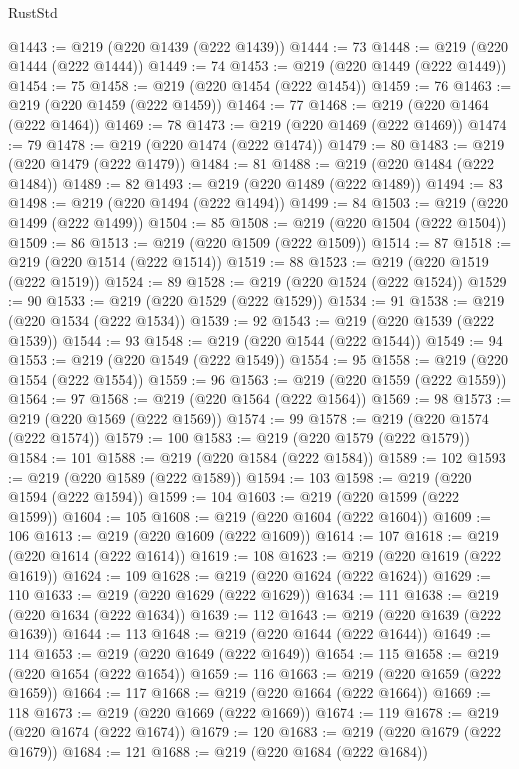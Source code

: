 \begin{lexlean}{RustStd}
\begin{coremodule}
@1443 := @219 (@220 @1439 (@222 @1439))
@1444 := 73
@1448 := @219 (@220 @1444 (@222 @1444))
@1449 := 74
@1453 := @219 (@220 @1449 (@222 @1449))
@1454 := 75
@1458 := @219 (@220 @1454 (@222 @1454))
@1459 := 76
@1463 := @219 (@220 @1459 (@222 @1459))
@1464 := 77
@1468 := @219 (@220 @1464 (@222 @1464))
@1469 := 78
@1473 := @219 (@220 @1469 (@222 @1469))
@1474 := 79
@1478 := @219 (@220 @1474 (@222 @1474))
@1479 := 80
@1483 := @219 (@220 @1479 (@222 @1479))
@1484 := 81
@1488 := @219 (@220 @1484 (@222 @1484))
@1489 := 82
@1493 := @219 (@220 @1489 (@222 @1489))
@1494 := 83
@1498 := @219 (@220 @1494 (@222 @1494))
@1499 := 84
@1503 := @219 (@220 @1499 (@222 @1499))
@1504 := 85
@1508 := @219 (@220 @1504 (@222 @1504))
@1509 := 86
@1513 := @219 (@220 @1509 (@222 @1509))
@1514 := 87
@1518 := @219 (@220 @1514 (@222 @1514))
@1519 := 88
@1523 := @219 (@220 @1519 (@222 @1519))
@1524 := 89
@1528 := @219 (@220 @1524 (@222 @1524))
@1529 := 90
@1533 := @219 (@220 @1529 (@222 @1529))
@1534 := 91
@1538 := @219 (@220 @1534 (@222 @1534))
@1539 := 92
@1543 := @219 (@220 @1539 (@222 @1539))
@1544 := 93
@1548 := @219 (@220 @1544 (@222 @1544))
@1549 := 94
@1553 := @219 (@220 @1549 (@222 @1549))
@1554 := 95
@1558 := @219 (@220 @1554 (@222 @1554))
@1559 := 96
@1563 := @219 (@220 @1559 (@222 @1559))
@1564 := 97
@1568 := @219 (@220 @1564 (@222 @1564))
@1569 := 98
@1573 := @219 (@220 @1569 (@222 @1569))
@1574 := 99
@1578 := @219 (@220 @1574 (@222 @1574))
@1579 := 100
@1583 := @219 (@220 @1579 (@222 @1579))
@1584 := 101
@1588 := @219 (@220 @1584 (@222 @1584))
@1589 := 102
@1593 := @219 (@220 @1589 (@222 @1589))
@1594 := 103
@1598 := @219 (@220 @1594 (@222 @1594))
@1599 := 104
@1603 := @219 (@220 @1599 (@222 @1599))
@1604 := 105
@1608 := @219 (@220 @1604 (@222 @1604))
@1609 := 106
@1613 := @219 (@220 @1609 (@222 @1609))
@1614 := 107
@1618 := @219 (@220 @1614 (@222 @1614))
@1619 := 108
@1623 := @219 (@220 @1619 (@222 @1619))
@1624 := 109
@1628 := @219 (@220 @1624 (@222 @1624))
@1629 := 110
@1633 := @219 (@220 @1629 (@222 @1629))
@1634 := 111
@1638 := @219 (@220 @1634 (@222 @1634))
@1639 := 112
@1643 := @219 (@220 @1639 (@222 @1639))
@1644 := 113
@1648 := @219 (@220 @1644 (@222 @1644))
@1649 := 114
@1653 := @219 (@220 @1649 (@222 @1649))
@1654 := 115
@1658 := @219 (@220 @1654 (@222 @1654))
@1659 := 116
@1663 := @219 (@220 @1659 (@222 @1659))
@1664 := 117
@1668 := @219 (@220 @1664 (@222 @1664))
@1669 := 118
@1673 := @219 (@220 @1669 (@222 @1669))
@1674 := 119
@1678 := @219 (@220 @1674 (@222 @1674))
@1679 := 120
@1683 := @219 (@220 @1679 (@222 @1679))
@1684 := 121
@1688 := @219 (@220 @1684 (@222 @1684))

\end{coremodule}
\end{lexlean}
